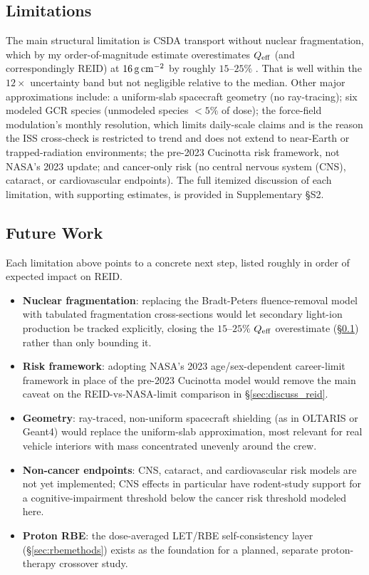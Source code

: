 \subsection{Limitations}
\label{sec:discuss_limits}

The main structural limitation is CSDA transport without nuclear
fragmentation, which by my order-of-magnitude estimate overestimates
$Q_\mathrm{eff}$ (and correspondingly REID) at $16\,\mathrm{g\,cm^{-2}}$ by roughly
$15$--$25\%$ \citep{wilson1991, slaba2014}. That is well within the $12\times$
uncertainty band but not negligible relative to the median. Other
major approximations include: a uniform-slab spacecraft geometry
(no ray-tracing); six modeled GCR species (unmodeled species $<5\%$ of
dose); the force-field modulation's monthly resolution, which limits
daily-scale claims and is the reason the ISS cross-check is restricted to
trend and does not extend to near-Earth or trapped-radiation
environments; the pre-2023 Cucinotta risk framework, not NASA's 2023
update; and cancer-only risk (no central nervous
system (CNS), cataract, or cardiovascular endpoints). The full itemized
discussion of
each limitation, with supporting estimates, is provided in Supplementary
\S{}S2.

\subsection{Future Work}
\label{sec:future_work}

Each limitation above points to a concrete next step, listed roughly in
order of expected impact on REID.
\begin{itemize}
  \item \textbf{Nuclear fragmentation}: replacing the
        Bradt-Peters fluence-removal model with tabulated fragmentation
        cross-sections \citep{wilson1991} would let secondary light-ion
        production be tracked explicitly, closing the $15$--$25\%$
        $Q_\mathrm{eff}$ overestimate (\S\ref{sec:discuss_limits}) rather than
        only bounding it.
  \item \textbf{Risk framework}: adopting NASA's 2023 age/sex-dependent
        career-limit framework \citep{nasa2023} in place of the pre-2023
        Cucinotta model would remove the main caveat on the
        REID-vs-NASA-limit comparison in \S\ref{sec:discuss_reid}.
  \item \textbf{Geometry}: ray-traced, non-uniform spacecraft shielding
        (as in OLTARIS or Geant4) would replace the uniform-slab
        approximation, most relevant for real vehicle interiors with mass
        concentrated unevenly around the crew.
  \item \textbf{Non-cancer endpoints}: CNS, cataract, and cardiovascular
        risk models are not yet implemented; CNS effects in particular
        have rodent-study support for a cognitive-impairment threshold
        below the cancer risk threshold modeled here.
  \item \textbf{Proton RBE}: the dose-averaged LET/RBE self-consistency
        layer (\S\ref{sec:rbemethods}) exists as the foundation for a
        planned, separate proton-therapy crossover study.
\end{itemize}

